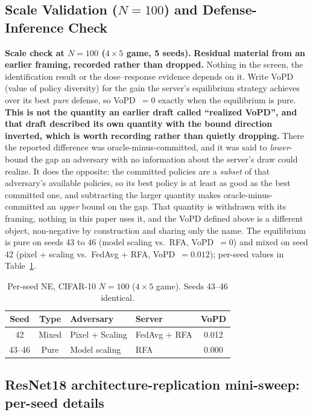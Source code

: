 \documentclass{article}
\begin{document}
\subsection{Scale Validation ($N=100$) and Defense-Inference Check}
\label{app:scale}
\label{app:inference}

\textbf{Scale check at $N=100$ ($4{\times}5$ game, 5 seeds).} \textbf{Residual material from an earlier framing, recorded rather than dropped.} Nothing in the screen, the identification result or the dose--response evidence depends on it. Write VoPD (value of policy diversity) for the gain the server's equilibrium strategy achieves over its best \emph{pure} defense, so VoPD~$=0$ exactly when the equilibrium is pure. \textbf{This is not the quantity an earlier draft called ``realized VoPD'', and that draft described its own quantity with the bound direction inverted, which is worth recording rather than quietly dropping.} There the reported difference was oracle-minus-committed, and it was said to \emph{lower}-bound the gap an adversary with no information about the server's draw could realize. It does the opposite: the committed policies are a \emph{subset} of that adversary's available policies, so its best policy is at least as good as the best committed one, and subtracting the larger quantity makes oracle-minus-committed an \emph{upper} bound on the gap. That quantity is withdrawn with its framing, nothing in this paper uses it, and the VoPD defined above is a different object, non-negative by construction and sharing only the name. The equilibrium is pure on seeds 43 to 46 (model scaling vs.\ RFA, VoPD~$=0$) and mixed on seed 42 (pixel + scaling vs.\ FedAvg + RFA, VoPD~$= 0.012$); per-seed values in Table~\ref{tab:scale100}.

\begin{table}[h]
\caption{Per-seed NE, CIFAR-10 $N=100$ ($4{\times}5$ game). Seeds 43--46 identical.}
\label{tab:scale100}
\centering\small
\begin{tabular}{c|c|l|l|c}
\toprule
Seed & Type & Adversary & Server & VoPD \\
\midrule
42      & Mixed & Pixel + Scaling & FedAvg + RFA & 0.012 \\
43--46  & Pure  & Model scaling   & RFA          & 0.000 \\
\bottomrule
\end{tabular}
\end{table}

\subsection{ResNet18 architecture-replication mini-sweep: per-seed details}
\label{app:resnet18_replication_details}
\end{document}
